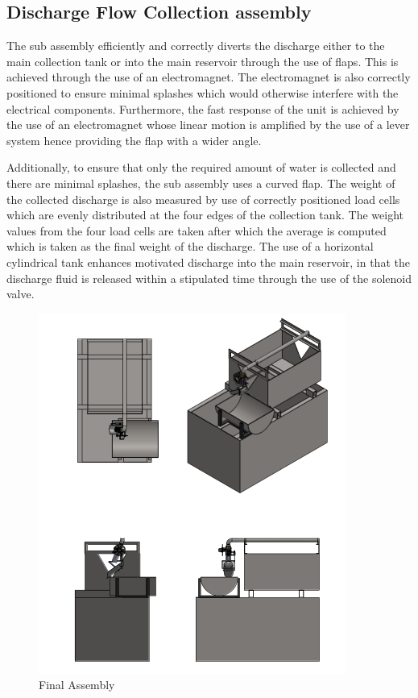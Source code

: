 \subsection{Discharge Flow Collection assembly}
\par
The sub assembly efficiently and correctly diverts the discharge either to the main collection tank or into the main reservoir through the use of flaps.  This is achieved through the use of an electromagnet. The electromagnet is also correctly positioned to ensure minimal splashes which would otherwise interfere with the electrical components. Furthermore, the fast response of the unit is achieved by the use of an electromagnet whose linear motion is amplified by the use of a lever system hence providing the flap with a wider angle.
\par
Additionally, to ensure that only the required amount of water is collected and there are minimal splashes, the sub assembly uses a curved flap. The weight of the collected discharge is also measured by use of correctly positioned load cells which are evenly distributed at the four edges of the collection tank. The weight values from the four load cells are taken after which the average is computed which is taken as the final weight of the discharge. The use of a horizontal cylindrical tank enhances motivated discharge into the main reservoir, in that the discharge fluid is released within a stipulated time through the use of the solenoid valve. 
\begin{figure}[ht]
    \centering
    \includegraphics[width=\textwidth,height=0.9\textheight,keepaspectratio]{Figures/final assembly.png}
    \caption{Final Assembly}
    \label{fig:final assembly}
\end{figure}


